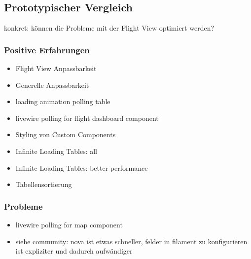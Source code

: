 \subsection{Prototypischer Vergleich}
konkret: können die Probleme mit der Flight View optimiert werden?

\subsubsection{Positive Erfahrungen}
\begin{itemize}
    \item Flight View Anpassbarkeit
    \item Generelle Anpassbarkeit
    \item loading animation polling table
    \item livewire polling for flight dashboard component
    \item Styling von Custom Components
    \item Infinite Loading Tables: all
    \item Infinite Loading Tables: better performance
    \item Tabellensortierung
\end{itemize}

\subsubsection{Probleme}
\begin{itemize}
    \item livewire polling for map component
    \item siehe community: nova ist etwas schneller, felder in filament zu konfigurieren ist expliziter und dadurch aufwändiger
\end{itemize}

